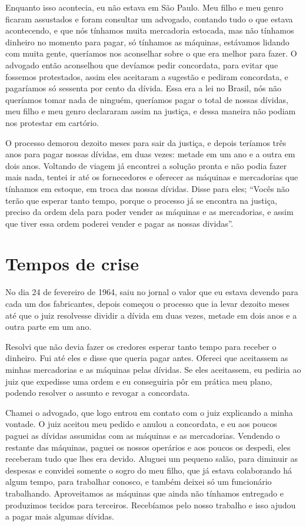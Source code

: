 Enquanto isso acontecia, eu não estava em São Paulo. Meu filho e meu
genro ficaram assustados e foram consultar um advogado, contando tudo o
que estava acontecendo, e que nós tínhamos muita mercadoria estocada,
mas não tínhamos dinheiro no momento para pagar, só tínhamos as
máquinas, estávamos lidando com muita gente, queríamos nos aconselhar
sobre o que era melhor para fazer. O advogado então aconselhou que
devíamos pedir concordata, para evitar que fossemos protestados, assim
eles aceitaram a sugestão e pediram concordata, e pagaríamos só sessenta
por cento da dívida. Essa era a lei no Brasil, nós não queríamos tomar
nada de ninguém, queríamos pagar o total de nossas dívidas, meu filho e
meu genro declararam assim na justiça, e dessa maneira não podiam nos
protestar em cartório.

O processo demorou dezoito meses para sair da justiça, e depois teríamos
três anos para pagar nossas dívidas, em duas vezes: metade em um ano e a
outra em dois anos. Voltando de viagem já encontrei a solução pronta e
não podia fazer mais nada, tentei ir até os fornecedores e oferecer as
máquinas e mercadorias que tínhamos em estoque, em troca das nossas
dívidas. Disse para eles; ``Vocês não terão que esperar tanto tempo,
porque o processo já se encontra na justiça, preciso da ordem dela para
poder vender as máquinas e as mercadorias, e assim que tiver essa ordem
poderei vender e pagar as nossas dividas''.

\chapter{Tempos de crise}

No dia 24 de fevereiro de 1964, saiu no jornal o valor que eu estava
devendo para cada um dos fabricantes, depois começou o processo que ia
levar dezoito meses até que o juiz resolvesse dividir a dívida em duas
vezes, metade em dois anos e a outra parte em um ano.

Resolvi que não devia fazer os credores esperar tanto tempo para receber
o dinheiro. Fui até eles e disse que queria pagar antes. Ofereci que
aceitassem as minhas mercadorias e as máquinas pelas dívidas. Se eles
aceitassem, eu pediria ao juiz que expedisse uma ordem e eu conseguiria
pôr em prática meu plano, podendo resolver o assunto e revogar a
concordata.

Chamei o advogado, que logo entrou em contato com o juiz explicando a
minha vontade. O juiz aceitou meu pedido e anulou a concordata, e eu aos
poucos paguei as dívidas assumidas com as máquinas e as mercadorias.
Vendendo o restante das máquinas, paguei os nossos operários e aos
poucos os despedi, eles receberam tudo que lhes era devido. Aluguei um
pequeno salão, para diminuir as despesas e convidei somente o sogro do
meu filho, que já estava colaborando há algum tempo, para trabalhar
conosco, e também deixei só um funcionário trabalhando. Aproveitamos as
máquinas que ainda não tínhamos entregado e produzimos tecidos para
terceiros. Recebíamos pelo nosso trabalho e isso ajudou a pagar mais
algumas dívidas.

